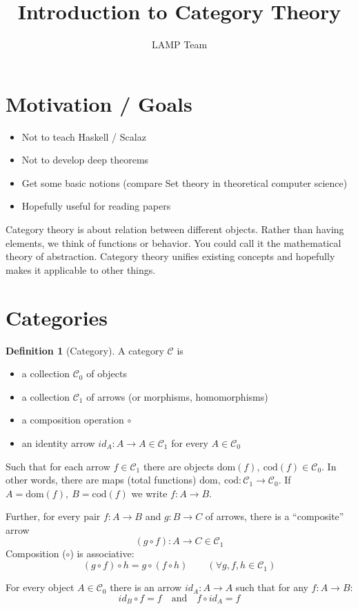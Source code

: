 \documentclass[fleqn]{scrartcl}
\newenvironment{category}{\begin{itemize}[leftmargin=.9in]}{\end{itemize}}
\newcommand{\catobj}[1]{\item[\textbf{Object}] #1}
\newcommand{\catarr}[1]{\item[\textbf{Arrows}] #1}
\newcommand{\catcomp}[1]{\item[\textbf{Comp.}] #1}
\newcommand{\catid}[1]{\item[\textbf{Ident.}] #1}
\newcommand{\cat}[1]{\mathcal{#1}}
\newcommand{\dom}{\mathrm{dom}}
\newcommand{\cod}{\mathrm{cod}}
\theoremstyle{definition} \newtheorem{definition}{Definition}
\theoremstyle{remark} \newtheorem{example}{Example}
\begin{document}
\title{Introduction to Category Theory}
\date{}
\author{LAMP Team}

\maketitle

\section{Motivation / Goals}

\begin{itemize}
\item Not to teach Haskell / Scalaz
\item Not to develop deep theorems
\item Get some basic notions (compare Set theory in theoretical
  computer science)
\item Hopefully useful for reading papers
\end{itemize}

Category theory is about relation between different objects. Rather
than having elements, we think of functions or behavior. You could
call it the mathematical theory of abstraction. Category theory
unifies existing concepts and hopefully makes it applicable to other
things.

\section{Categories}

\begin{definition}[Category]
  A category $\cat{C}$ is
  \begin{category}
    \catobj{a collection $\cat{C}_0$ of objects}
    \catarr{a collection $\cat{C}_1$ of arrows (or morphisms,
      homomorphisms)}
    \catcomp{a composition operation $\circ$}
    \catid{an identity arrow $id_A: A \to A \in \cat{C}_1$ for every $A
      \in \cat{C}_0$}
  \end{category}
  Such that for each arrow $f \in \cat{C}_1$ there are objects
  $\dom(f),\ \cod(f) \in \cat{C}_0$. In other words, there are maps
  (total functions) $\dom,\ \cod : \cat{C}_1 \to  \cat{C}_0$. If $A =
  \dom(f),\ B = \cod(f)$ we write $f : A \to B$.
  
  Further, for every pair $f : A \to B$ and $g : B \to C$ of arrows,
  there is a  ``composite'' arrow
  \[ (g \circ f) : A \to C \in \cat{C}_1 \]
  Composition ($\circ$) is associative:
  \[ (g \circ f) \circ h = g \circ (f \circ h) \qquad (\forall g,f,h
  \in \cat{C}_1) \]
  
  For every object $A \in \cat{C}_0$ there is an arrow $id_A: A \to A$
  such that for any $f : A \to B$:
  \[ id_B \circ f = f \quad\mathrm{and}\quad f \circ id_A = f \]
\end{definition}
\end{document}
